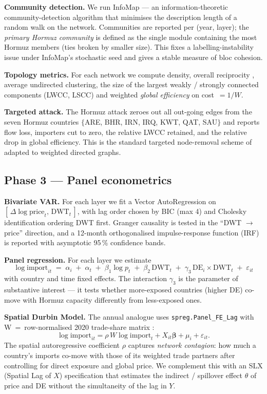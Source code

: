 \documentclass[11pt,a4paper]{article}
\begin{document}
\textbf{Community detection.} We run InfoMap
\citep{rosvall2008} --- an information-theoretic community-detection
algorithm that minimises the description length of a random walk on
the network. Communities are reported per (year, layer); the
\emph{primary Hormuz community} is defined as the single module
containing the most Hormuz members (ties broken by smaller size). This
fixes a labelling-instability issue under InfoMap's stochastic seed
and gives a stable measure of bloc cohesion.

\textbf{Topology metrics.} For each network we compute density,
overall reciprocity \citep{garlaschelli2004},
average undirected clustering, the size of the largest weakly /
strongly connected components (LWCC, LSCC) and weighted
\emph{global efficiency} \citep{latora2001} on cost~$=1/W$.

\textbf{Targeted attack.} The Hormuz attack zeroes out all
out-going edges from the seven Hormuz countries
$\{$ARE, BHR, IRN, IRQ, KWT, QAT, SAU$\}$ and reports
flow loss, importers cut to zero, the relative LWCC retained, and the
relative drop in global efficiency. This is the standard targeted
node-removal scheme of \citet{albert2000} adapted to weighted directed
graphs.

\subsection{Phase 3 --- Panel econometrics}

\textbf{Bivariate VAR.} For each layer we fit a Vector AutoRegression
\citep{sims1980} on
$[\,\Delta\!\log\text{price}_t,\, \text{DWT}_t\,]$, with lag
order chosen by BIC (max 4) and Cholesky identification ordering DWT
first. Granger causality \citep{granger1969} is tested in the
``DWT $\rightarrow$ price'' direction, and a 12-month orthogonalised
impulse-response function (IRF) is reported with asymptotic 95\,\%
confidence bands.

\textbf{Panel regression.} For each layer we estimate
\[
  \log \text{import}_{it}
   \;=\; \alpha_i \;+\; \alpha_t
   \;+\; \beta_1 \log p_t
   \;+\; \beta_2 \,\text{DWT}_t
   \;+\; \gamma_3 \,\text{DE}_i \!\times\! \text{DWT}_t
   \;+\; \varepsilon_{it}
\]
with country and time fixed effects. The interaction
$\gamma_3$ is the parameter of substantive interest --- it tests
whether more-exposed countries (higher DE) co-move with Hormuz
capacity differently from less-exposed ones.

\textbf{Spatial Durbin Model.} The annual analogue uses
\texttt{spreg.Panel\_FE\_Lag} with W~=~row-normalised 2020 trade-share
matrix \citep{lesage2009, rey2010}:
\[
  \log\text{import}_{it} = \rho\,W \log\text{import}_{t}
   + X_{it}\boldsymbol\beta + \mu_i + \varepsilon_{it}.
\]
The spatial autoregressive coefficient $\rho$ captures
\emph{network contagion}: how much a country's imports co-move with
those of its weighted trade partners after controlling for direct
exposure and global price. We complement this with an SLX (Spatial
Lag of $X$) specification that estimates the indirect / spillover
effect $\theta$ of price and DE without the simultaneity of the lag
in $Y$.
\end{document}

